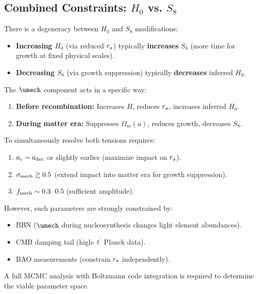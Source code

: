 \subsection{Combined Constraints: $H_0$ vs. $S_8$}
\label{sec:combined_constraints}

There is a degeneracy between $H_0$ and $S_8$ modifications:
\begin{itemize}
\item \textbf{Increasing $H_0$} (via reduced $r_s$) typically \textbf{increases} $S_8$ (more time for growth at fixed physical scales).
\item \textbf{Decreasing $S_8$} (via growth suppression) typically \textbf{decreases} inferred $H_0$.
\end{itemize}

The $\umech$ component acts in a specific way:
\begin{enumerate}
\item \textbf{Before recombination:} Increases $H$, reduces $r_s$, increases inferred $H_0$.
\item \textbf{During matter era:} Suppresses $\Omega_m(a)$, reduces growth, decreases $S_8$.
\end{enumerate}

\begin{theorem}
\label{thm:parameter_space}
To simultaneously resolve both tensions requires:
\begin{enumerate}
\item $a_c \sim a_{\mathrm{dec}}$ or slightly earlier (maximize impact on $r_s$).
\item $\sigma_{\mathrm{mech}} \gtrsim 0.5$ (extend impact into matter era for growth suppression).
\item $f_{\mathrm{mech}} \sim 0.3$--$0.5$ (sufficient amplitude).
\end{enumerate}

However, such parameters are strongly constrained by:
\begin{itemize}
\item BBN ($\umech$ during nucleosynthesis changes light element abundances).
\item CMB damping tail (high-$\ell$ Planck data).
\item BAO measurements (constrain $r_s$ independently).
\end{itemize}

A full MCMC analysis with Boltzmann code integration is required to determine the viable parameter space.
\end{theorem}


